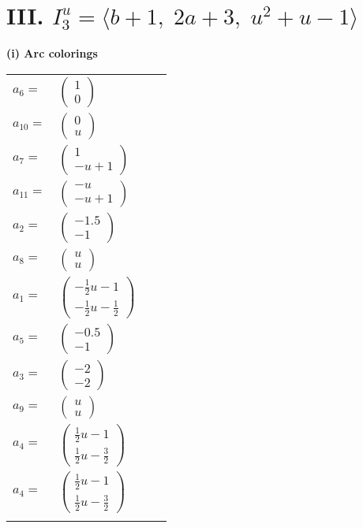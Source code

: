 \documentclass[1p]{elsarticle_modified}
\theoremstyle{definition}
\begin{document}
\centering \section*{III. $I^u_{3}= \langle b+1,\;2 a+3,\;u^2+u-1 \rangle$}
\flushleft \textbf{(i) Arc colorings}\\
\begin{tabular}{m{7pt} m{180pt} m{7pt} m{180pt} }
\flushright $a_{6}=$&$\begin{pmatrix}1\\0\end{pmatrix}$ \\
\flushright $a_{10}=$&$\begin{pmatrix}0\\u\end{pmatrix}$ \\
\flushright $a_{7}=$&$\begin{pmatrix}1\\- u+1\end{pmatrix}$ \\
\flushright $a_{11}=$&$\begin{pmatrix}- u\\- u+1\end{pmatrix}$ \\
\flushright $a_{2}=$&$\begin{pmatrix}-1.5\\-1\end{pmatrix}$ \\
\flushright $a_{8}=$&$\begin{pmatrix}u\\u\end{pmatrix}$ \\
\flushright $a_{1}=$&$\begin{pmatrix}-\frac{1}{2} u-1\\-\frac{1}{2} u-\frac{1}{2}\end{pmatrix}$ \\
\flushright $a_{5}=$&$\begin{pmatrix}-0.5\\-1\end{pmatrix}$ \\
\flushright $a_{3}=$&$\begin{pmatrix}-2\\-2\end{pmatrix}$ \\
\flushright $a_{9}=$&$\begin{pmatrix}u\\u\end{pmatrix}$ \\
\flushright $a_{4}=$&$\begin{pmatrix}\frac{1}{2} u-1\\\frac{1}{2} u-\frac{3}{2}\end{pmatrix}$\\ \flushright $a_{4}=$&$\begin{pmatrix}\frac{1}{2} u-1\\\frac{1}{2} u-\frac{3}{2}\end{pmatrix}$\\&\end{tabular}
\end{document}
